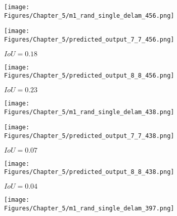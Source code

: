 \begin{figure} [h!]
	\par\medskip
	\begin{subfigure}[b]{0.32\textwidth}
		\centering
		\texttt{[image: Figures/Chapter\_5/m1\_rand\_single\_delam\_456.png]}
		\caption{}
		\label{fig:GT_case_456}
	\end{subfigure}	
	\hfill
	\begin{subfigure}[b]{0.32\textwidth}
		\centering
		\texttt{[image: Figures/Chapter\_5/predicted\_output\_7\_7\_456.png]}
		\caption{\(IoU=0.18\)}
		\label{fig:pred_7_7_case_456}
	\end{subfigure}
	\hfill
	\begin{subfigure}[b]{0.32\textwidth}
		\centering
		\texttt{[image: Figures/Chapter\_5/predicted\_output\_8\_8\_456.png]}
		\caption{\(IoU=0.23\)}
		\label{fig:pred_8_8_case_456}
	\end{subfigure}	
	\par\medskip
	\begin{subfigure}[b]{0.32\textwidth}
		\centering
		\texttt{[image: Figures/Chapter\_5/m1\_rand\_single\_delam\_438.png]}
		\caption{}
		\label{fig:GT_case_438}
	\end{subfigure}
	\hfill
	\begin{subfigure}[b]{0.32\textwidth}
		\centering
		\texttt{[image: Figures/Chapter\_5/predicted\_output\_7\_7\_438.png]}
		\caption{\(IoU=0.07\)}
		\label{fig:pred_7_7_case_438}
	\end{subfigure}
	\hfill
	\begin{subfigure}[b]{0.32\textwidth}
		\centering
		\texttt{[image: Figures/Chapter\_5/predicted\_output\_8\_8\_438.png]}
		\caption{\(IoU=0.04\)}
		\label{fig:pred_8_8_case_438}
	\end{subfigure}
	\par\medskip
	\begin{subfigure}[b]{0.32\textwidth}
		\centering
		\texttt{[image: Figures/Chapter\_5/m1\_rand\_single\_delam\_397.png]}
		\caption{}

\end{subfigure}
\end{figure}
